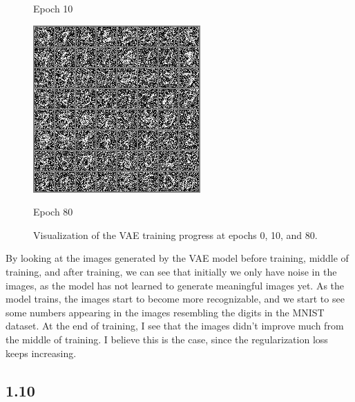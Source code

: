 \documentclass{article}
\begin{document}
\begin{figure}[H]
\begin{minipage}{0.3\textwidth}
        \caption{Epoch 10}
        \label{fig:epoch_10}
    \end{minipage}
    \hfill
    \begin{minipage}{0.3\textwidth}
        \centering
        \includegraphics[width=\textwidth]{images/epoch_80_samples.png}
        \caption{Epoch 80}
        \label{fig:epoch_80}
    \end{minipage}
    \caption{Visualization of the VAE training progress at epochs 0, 10, and 80.}
    \label{fig:vae_epochs}
\end{figure}

By looking at the images generated by the VAE model before training, middle of training, and after training, we can see that
initially we only have noise in the images, as the model has not learned to generate meaningful images yet. As the model
trains, the images start to become more recognizable, and we start to see some numbers appearing in the images resembling
the digits in the MNIST dataset. At the end of training, I see that the images didn't improve much from the middle of training.
I believe this is the case, since the regularization loss keeps increasing. 

\subsection*{1.10}
\end{document}
